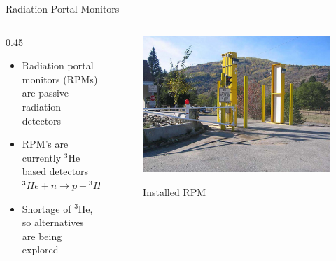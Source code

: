 \documentclass{beamer}
\begin{document}
\begin{frame}{Radiation Portal Monitors}

\begin{columns}[onlytextwidth]
	\begin{column} {0.45\textwidth}
  	\begin{itemize}
  		\item Radiation portal monitors (RPMs) are passive radiation detectors
  		\item {
  			 RPM's are currently   ${}^3$He based detectors
  			\center
    		${}^3He +n \to p +{}^3H$
    	}
  		\item 
  			Shortage of ${}^3$He, so alternatives are being explored
  		\end{itemize}
	\end{column}
	\begin{column}{0.5\textwidth}
		\centering
		\begin{figure}
			\includegraphics[width=\textwidth]{images/RPM8_Installed.eps}
			\label{fig:RPM8Installed}
			\caption{Installed RPM}
			\end{figure}
	\end{column}
\end{columns}
\end{frame}
\end{document}
